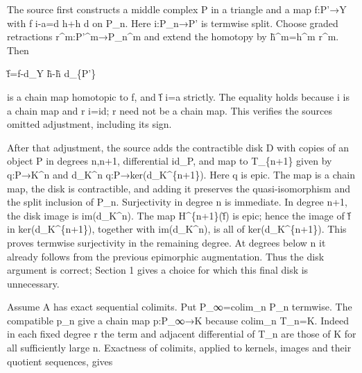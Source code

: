 \documentclass[11pt]{article}
\begin{document}
The source first constructs a middle complex P\textquotesingle{} in a triangle and a map f:\allowbreak{}P'\allowbreak{}→Y with f i-a\allowbreak{}=d h\allowbreak{}+h d on P\_\allowbreak{}n. Here i:\allowbreak{}P\_\allowbreak{}n\allowbreak{}→P' is termwise split. Choose graded retractions r\textasciicircum{}m:\allowbreak{}P'\textasciicircum{}m\allowbreak{}→P\_\allowbreak{}n\textasciicircum{}m and extend the homotopy by h̃\textasciicircum{}m\allowbreak{}=h\textasciicircum{}m r\^{}m. Then

f̃\allowbreak{}=f-d\_\allowbreak{}Y h̃-h̃ d\_\allowbreak{}\{P'\}

is a chain map homotopic to f,\allowbreak{} and f̃ i\allowbreak{}=a strictly. The equality holds because i is a chain map and r i\allowbreak{}=id; r need not be a chain map. This verifies the source\textquotesingle s omitted adjustment,\allowbreak{} including its sign.

After that adjustment,\allowbreak{} the source adds the contractible disk D with copies of an object P in degrees n,\allowbreak{}n\allowbreak{}+1,\allowbreak{} differential id\_\allowbreak{}P,\allowbreak{} and map to T\_\allowbreak{}\{n\allowbreak{}+1\} given by q:\allowbreak{}P\allowbreak{}→K\textasciicircum{}n and d\_\allowbreak{}K\textasciicircum{}n q:\allowbreak{}P\allowbreak{}→ker(d\_\allowbreak{}K\textasciicircum{}\{n\allowbreak{}+1\})\allowbreak{}. Here q is epic. The map is a chain map,\allowbreak{} the disk is contractible,\allowbreak{} and adding it preserves the quasi-isomorphism and the split inclusion of P\_\allowbreak{}n. Surjectivity in degree n is immediate. In degree n\allowbreak{}+1,\allowbreak{} the disk image is im(d\_\allowbreak{}K\textasciicircum{}n)\allowbreak{}. The map H\textasciicircum{}\{n\allowbreak{}+1\}(f̃)\allowbreak{} is epic; hence the image of f̃ in ker(d\_\allowbreak{}K\textasciicircum{}\{n\allowbreak{}+1\})\allowbreak{},\allowbreak{} together with im(d\_\allowbreak{}K\textasciicircum{}n)\allowbreak{},\allowbreak{} is all of ker(d\_\allowbreak{}K\textasciicircum{}\{n\allowbreak{}+1\})\allowbreak{}. This proves termwise surjectivity in the remaining degree. At degrees below n it already follows from the previous epimorphic augmentation. Thus the disk argument is correct; Section 1 gives a choice for which this final disk is unnecessary.

Assume A has exact sequential colimits. Put P\_\allowbreak{}∞\allowbreak{}=colim\_\allowbreak{}n P\_\allowbreak{}n termwise. The compatible p\_\allowbreak{}n give a chain map p:\allowbreak{}P\_\allowbreak{}∞\allowbreak{}→K because colim\_\allowbreak{}n T\_\allowbreak{}n\allowbreak{}=K. Indeed in each fixed degree r the term and adjacent differential of T\_\allowbreak{}n are those of K for all sufficiently large n. Exactness of colimits,\allowbreak{} applied to kernels,\allowbreak{} images and their quotient sequences,\allowbreak{} gives
\end{document}
